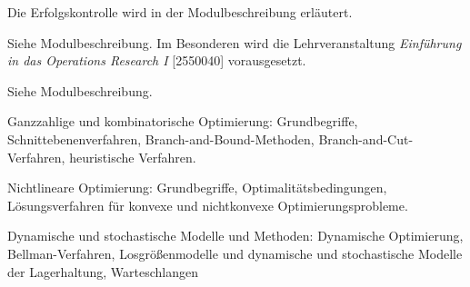 \begin{course}

\setdoclanguagegerman
{}



\coursehead


\label{cour_4403.dp_997}


\begin{styleenv}
\begin{assessment}
Die Erfolgskontrolle wird in der Modulbeschreibung erläutert.


\end{assessment}

\begin{conditions}Siehe Modulbeschreibung. Im Besonderen wird die Lehrveranstaltung \emph{Einführung in das Operations Research I} [2550040] vorausgesetzt.

\end{conditions}


\end{styleenv}

\begin{learningoutcomes}
Siehe Modulbeschreibung.


\end{learningoutcomes}

\begin{content}
Ganzzahlige und kombinatorische Optimierung: Grundbegriffe, Schnittebenenverfahren, Branch-and-Bound-Methoden, Branch-and-Cut-Verfahren, heuristische Verfahren.

 

Nichtlineare Optimierung: Grundbegriffe, Optimalitätsbedingungen, Lösungsverfahren für konvexe und nichtkonvexe Optimierungsprobleme.

 

Dynamische und stochastische Modelle und Methoden: Dynamische Optimierung, Bellman-Verfahren, Losgrößenmodelle und dynamische und stochastische Modelle der Lagerhaltung, Warteschlangen



\end{content}
\end{course}
